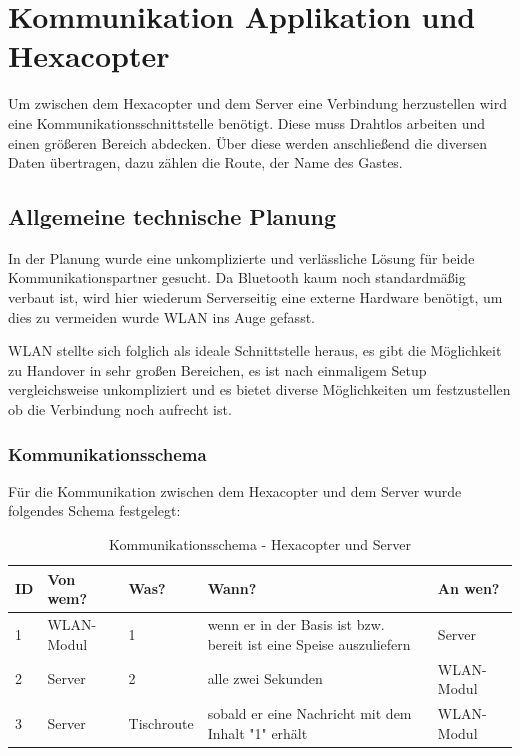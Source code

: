 \chapter{Kommunikation Applikation und Hexacopter}
\renewcommand{\kapitelautor}{Autor: Katharina Joksch, Lucas Ullrich}
Um zwischen dem Hexacopter und dem Server eine Verbindung herzustellen wird eine Kommunikationsschnittstelle benötigt. Diese muss Drahtlos arbeiten und einen größeren Bereich
abdecken. Über diese werden anschließend die diversen Daten übertragen, dazu zählen \zB die Route, \bzw der Name des Gastes.

\section{Allgemeine technische Planung}
In der Planung wurde eine unkomplizierte und verlässliche Lösung für beide Kommunikationspartner gesucht. Da Bluetooth kaum noch standardmäßig verbaut ist, wird hier wiederum
Serverseitig eine externe Hardware benötigt, um dies zu vermeiden wurde WLAN ins Auge gefasst.

WLAN stellte sich folglich als ideale Schnittstelle heraus,
es gibt die Möglichkeit zu Handover in sehr großen Bereichen, es ist nach einmaligem Setup vergleichsweise unkompliziert und es bietet diverse Möglichkeiten um festzustellen
ob die Verbindung noch aufrecht ist.

      \subsection{Kommunikationsschema}
Für die Kommunikation zwischen dem Hexacopter und dem Server wurde folgendes Schema festgelegt:
\begin{table}[H]
\centering
\begin{tabular}{|p{0.5cm}|p{2cm}|p{2cm}|p{5.5cm}|p{2cm}|} 
\hline \textbf{ID} & \textbf{Von wem?} & \textbf{Was?} & \textbf{Wann?} & \textbf{An wen?} \\\hline
\hline 1 & WLAN-Modul & 1 & wenn er in der Basis ist bzw. \newline bereit ist eine Speise auszuliefern & Server \\\hline
\hline 2 & Server & 2 & alle zwei Sekunden & WLAN-Modul \\\hline
\hline 3 & Server & Tischroute & sobald er eine Nachricht mit dem Inhalt "1" erhält & WLAN-Modul \\\hline
\end{tabular}
\caption{Kommunikationsschema - Hexacopter und Server}
\end{table}

